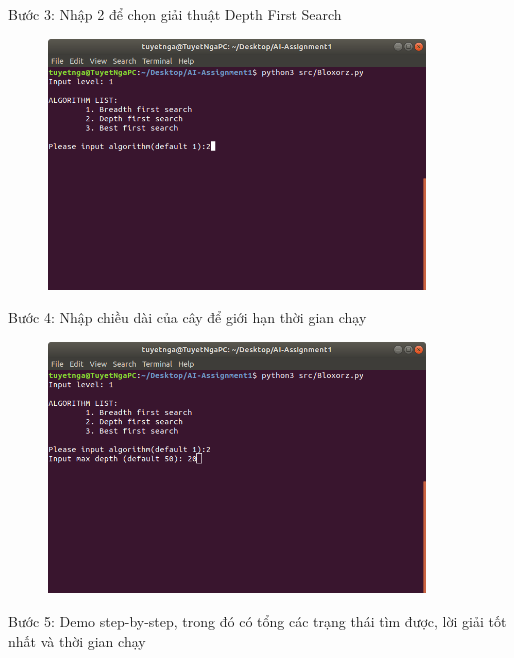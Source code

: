 \documentclass[11pt,a4paper]{article}
\begin{document}
\newpage
\begin{flushleft}
	\hspace{3 cm} Bước 3: Nhập 2 để chọn giải thuật Depth First Search
\end{flushleft}
\begin{center}
	\begin{figure}[htp]
		\begin{center}
			\includegraphics[width=10cm]{Images/depth3.png}
		\end{center}
		\caption{\label{fig:depth3}}
	\end{figure}
\end{center}
\begin{flushleft}
	\hspace{2 cm}	Bước 4: Nhập chiều dài của cây để giới hạn thời gian chạy
\end{flushleft}
\begin{center}
	\begin{figure}[htp]
		\begin{center}
			\includegraphics[width=10cm]{Images/depth4.png}
		\end{center}
		\caption{\label{fig:depth4}}
	\end{figure}
\end{center}
\newpage
\begin{flushleft}
	\hspace{2 cm}	Bước 5: Demo step-by-step, trong đó có tổng các trạng thái tìm được, lời giải tốt nhất và thời gian chạy
\end{flushleft}
\end{document}
